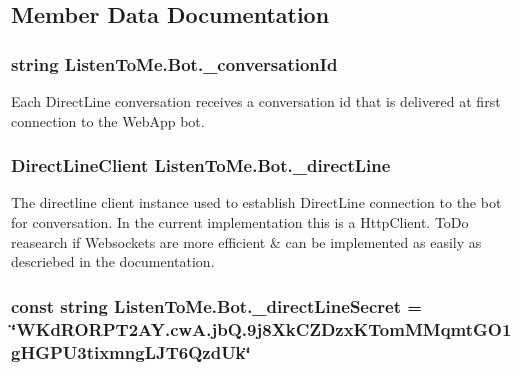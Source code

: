 \subsection{Member Data Documentation}
\subsubsection[{\texorpdfstring{\+\_\+conversation\+Id}{_conversationId}}]{\setlength{\rightskip}{0pt plus 5cm}string Listen\+To\+Me.\+Bot.\+\_\+conversation\+Id\hspace{0.3cm}{\ttfamily [private]}}\hypertarget{class_listen_to_me_1_1_bot_a2537a949a0ae2f9adab1e080ad2a9c3a}{}\label{class_listen_to_me_1_1_bot_a2537a949a0ae2f9adab1e080ad2a9c3a}


Each Direct\+Line conversation receives a conversation id that is delivered at first connection to the Web\+App bot. 

\subsubsection[{\texorpdfstring{\+\_\+direct\+Line}{_directLine}}]{\setlength{\rightskip}{0pt plus 5cm}Direct\+Line\+Client Listen\+To\+Me.\+Bot.\+\_\+direct\+Line\hspace{0.3cm}{\ttfamily [private]}}\hypertarget{class_listen_to_me_1_1_bot_a964ea223816ac25f4ccf8357edb2f5ad}{}\label{class_listen_to_me_1_1_bot_a964ea223816ac25f4ccf8357edb2f5ad}


The directline client instance used to establish Direct\+Line connection to the bot for conversation. In the current implementation this is a Http\+Client. To\+Do reasearch if Websockets are more efficient \& can be implemented as easily as descriebed in the documentation. 

\subsubsection[{\texorpdfstring{\+\_\+direct\+Line\+Secret}{_directLineSecret}}]{\setlength{\rightskip}{0pt plus 5cm}const string Listen\+To\+Me.\+Bot.\+\_\+direct\+Line\+Secret = \char`\"{}W\+Kd\+R\+O\+R\+P\+T2\+A\+Y.\+cw\+A.\+jb\+Q.\+9j8\+Xk\+C\+Z\+Dzx\+K\+Tom\+M\+Mqmt\+G\+O1g\+H\+G\+P\+U3tixmng\+L\+J\+T6\+Qzd\+Uk\char`\"{}\hspace{0.3cm}{\ttfamily [private]}}\hypertarget{class_listen_to_me_1_1_bot_a3f7fa2c3cbea4ec11f5a75e2e8c9c72d}{}\label{class_listen_to_me_1_1_bot_a3f7fa2c3cbea4ec11f5a75e2e8c9c72d}
